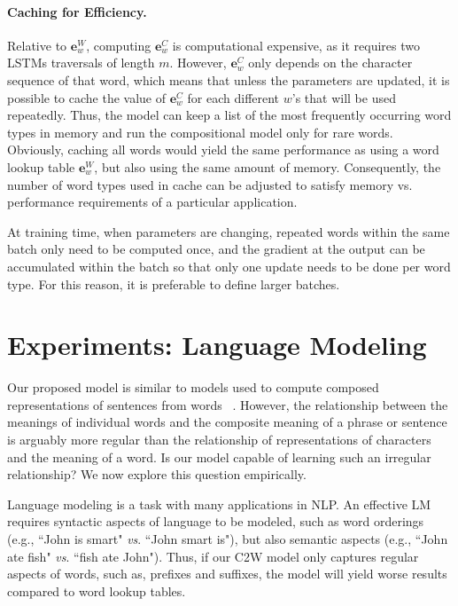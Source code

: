 \documentclass[11pt]{article}
\begin{document}
\begin{CJK*}{UTF8}{gbsn}
\paragraph{Caching for Efficiency.} Relative to $\mathbf{e}^W_w$, computing $\mathbf{e}^C_w$ is computational expensive, as it requires two LSTMs traversals of length $m$. However, $\mathbf{e}^C_w$ only depends on the character sequence of that word, which means that unless the parameters are updated, it is possible to cache the value of $\mathbf{e}^C_w$ for each different $w$'s that will be used repeatedly. Thus, the model can keep a list of the most frequently occurring word types in memory and run the compositional model only for rare words. Obviously, caching all words would yield the same performance as using a word lookup table $\mathbf{e}^W_w$, but also using the same amount of memory. Consequently, the number of word types used in cache can be adjusted to satisfy memory vs. performance requirements of a particular application.

At training time, when parameters are changing, repeated words within the same batch only need to be computed once, and the gradient at the output can be accumulated within the batch so that only one update needs to be done per word type. For this reason, it is preferable to define larger batches.



\section{Experiments: Language Modeling}
\label{sec:lang}

Our proposed model is similar to models used to compute composed representations of sentences from words ~\cite{cho-EtAl:2014:EMNLP2014,DBLP:journals/corr/LiJH15}. However, the relationship between the meanings of individual words and the composite meaning of a phrase or sentence is arguably more regular than the relationship of representations of characters and the meaning of a word. Is our model capable of learning such an irregular relationship? We now explore this question empirically. 

Language modeling is a task with many applications in NLP.  An effective LM requires syntactic aspects of language to be modeled, such as word orderings (e.g., ``John is smart" \emph{vs}. ``John smart is"), but also semantic aspects (e.g., ``John ate fish" \emph{vs}. ``fish ate John"). Thus, if our C2W model only captures regular aspects of words, such as, prefixes and suffixes, the model will yield worse results compared to word lookup tables.


\end{CJK*}
\end{document}

